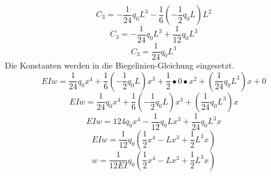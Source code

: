 \begin{equation}
	C_3=
	-\frac{1}{24}q_0L^3-\frac{1}{6}\left(-\frac{1}{2}q_0L\right)L^2
\end{equation}
\begin{equation}
	C_3=
	-\frac{1}{24}q_0L^3+\frac{1}{12}q_0L^3
\end{equation}
\begin{equation}
	C_3=
	\frac{1}{24}q_0L^3
\end{equation}
Die Konstanten werden in die Biegelinien-Gleichung eingesetzt.
\begin{equation}
	EIw=
	\frac{1}{24}q_0x^4+\frac{1}{6}\left(-\frac{1}{2}q_0L\right)x^3+\frac{1}{2}\bullet0\bullet x^2+\left(\frac{1}{24}q_0L^3\right)x+0
\end{equation}
\begin{equation}
	EIw=
	\frac{1}{24}q_0x^4+\frac{1}{6}\left(-\frac{1}{2}q_0L\right)x^3+\left(\frac{1}{24}q_0L^3\right)x
\end{equation}
\begin{equation}
	EIw=
	{1}{24}q_0x^4-\frac{1}{12}q_0Lx^3+\frac{1}{24}q_0L^3x
\end{equation}
\begin{equation}
	EIw=
	\frac{1}{12}q_0\left(\frac{1}{2}x^4-Lx^3+\frac{1}{2}L^3x\right)
\end{equation}
\begin{equation}
	w=
	\frac{1}{12EI}q_0\left(\frac{1}{2}x^4-Lx^3+\frac{1}{2}L^3x\right)
\end{equation}


